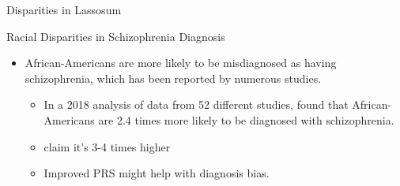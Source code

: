\documentclass{beamer}
\begin{document}
\begin{frame}{Disparities in Lassosum}

\begin{figure}[h]	
\noindent{}
   \label{fig:lassosum disparities}
\end{figure}

\end{frame}

\begin{frame}{Racial Disparities in Schizophrenia Diagnosis}

\begin{itemize}
    \item African-Americans are more likely to be misdiagnosed as having schizophrenia, which has been reported by numerous studies.
        \begin{itemize}
            \item    In a 2018 analysis of data from 52 different studies, \cite{olbert2018meta} found that African-Americans are 2.4 times more likely to be diagnosed with schizophrenia. \\
            \item \cite{schwartz2014racial} claim it's 3-4 times higher
            \item Improved PRS might help with diagnosis bias.
        \end{itemize}
\end{itemize}

\end{frame}
\end{document}
